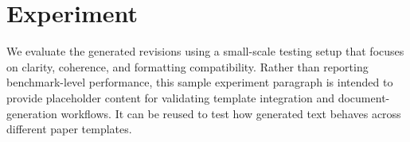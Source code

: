 \section{Experiment}

We evaluate the generated revisions using a small-scale testing setup that focuses on clarity, coherence, and formatting compatibility. Rather than reporting benchmark-level performance, this sample experiment paragraph is intended to provide placeholder content for validating template integration and document-generation workflows. It can be reused to test how generated text behaves across different paper templates.
